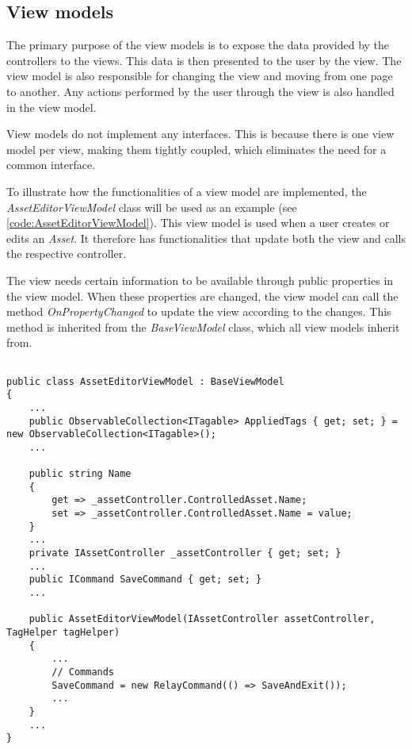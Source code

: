 \subsection{View models} \label{sc:ViewModels}
The primary purpose of the view models is to expose the data provided by the controllers to the views. This data is then presented to the user by the view. The view model is also responsible for changing the view and moving from one page to another. Any actions performed by the user through the view is also handled in the view model. 
\par

View models do not implement any interfaces. This is because there is one view model per view, making them tightly coupled, which eliminates the need for a common interface.
\par
To illustrate how the functionalities of a view model are implemented, the \textit{AssetEditorViewModel} class will be used as an example (see \autoref{code:AssetEditorViewModel}). This view model is used when a user creates or edits an \textit{Asset}. It therefore has functionalities that update both the view and calls the respective controller.
\par
The view needs certain information to be available through public properties in the view model. When these properties are changed, the view model can call the method \textit{OnPropertyChanged} to update the view according to the changes. This method is inherited from the \textit{BaseViewModel} class, which all view models inherit from.

\begin{listing}[H]
\begin{verbatim}

public class AssetEditorViewModel : BaseViewModel
{
    ...
    public ObservableCollection<ITagable> AppliedTags { get; set; } = new ObservableCollection<ITagable>();
    ...

    public string Name
    {
        get => _assetController.ControlledAsset.Name;
        set => _assetController.ControlledAsset.Name = value;
    }
    ...
    private IAssetController _assetController { get; set; }
    ...
    public ICommand SaveCommand { get; set; }
    ...

    public AssetEditorViewModel(IAssetController assetController, TagHelper tagHelper)
    {
        ...
        // Commands
        SaveCommand = new RelayCommand(() => SaveAndExit());
        ...
    }
    ...
}

\end{verbatim}
\label{code:AssetEditorViewModel}
\end{listing}

